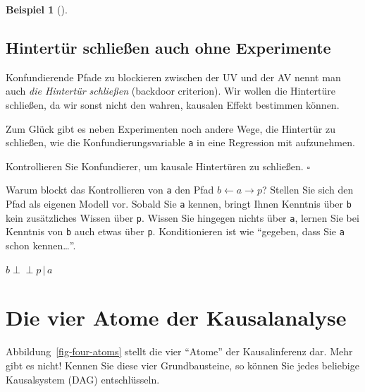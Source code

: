 \documentclass[
  ngerman,
  letterpaper,
  twoside,
  open=any]{scrbook}
\theoremstyle{definition}
\newtheorem{example}{Beispiel}[chapter]
\theoremstyle{plain}
\theoremstyle{definition}
\theoremstyle{definition}
\theoremstyle{remark}
\begin{document}
\begin{example}[]
\begin{tcolorbox}
\end{tcolorbox}

\subsection{Hintertür schließen auch ohne
Experimente}\label{hintertuxfcr-schlieuxdfen-auch-ohne-experimente}

Konfundierende Pfade zu blockieren zwischen der UV und der AV nennt man
auch \emph{die Hintertür schließen} (backdoor criterion). Wir wollen die
Hintertüre schließen, da wir sonst nicht den wahren, kausalen Effekt
bestimmen können.

Zum Glück gibt es neben Experimenten noch andere Wege, die Hintertür zu
schließen, wie die Konfundierungsvariable \texttt{a} in eine Regression
mit aufzunehmen.

\begin{tcolorbox}[enhanced jigsaw, arc=.35mm, bottomrule=.15mm, bottomtitle=1mm, breakable, colback=white, colbacktitle=quarto-callout-tip-color!10!white, colframe=quarto-callout-tip-color-frame, coltitle=black, left=2mm, leftrule=.75mm, opacityback=0, opacitybacktitle=0.6, rightrule=.15mm, title=\textcolor{quarto-callout-tip-color}{\faLightbulb}\hspace{0.5em}{Tipp}, titlerule=0mm, toprule=.15mm, toptitle=1mm]

Kontrollieren Sie Konfundierer, um kausale Hintertüren zu schließen.
\(\square\)

\end{tcolorbox}

Warum blockt das Kontrollieren von \texttt{a} den Pfad
\(b \leftarrow a \rightarrow p\)? Stellen Sie sich den Pfad als eigenen
Modell vor. Sobald Sie \texttt{a} kennen, bringt Ihnen Kenntnis über
\texttt{b} kein zusätzliches Wissen über \texttt{p}. Wissen Sie hingegen
nichts über \texttt{a}, lernen Sie bei Kenntnis von \texttt{b} auch
etwas über \texttt{p}. Konditionieren ist wie \enquote{gegeben, dass Sie
\texttt{a} schon kennen\ldots{}}.

\(b \perp \!\!\! \perp p \,|\,a\)

\section{Die vier Atome der
Kausalanalyse}\label{die-vier-atome-der-kausalanalyse}

Abbildung~\ref{fig-four-atoms} stellt die vier \enquote{Atome} der
Kausalinferenz dar. Mehr gibt es nicht! Kennen Sie diese vier
Grundbausteine, so können Sie jedes beliebige Kausalsystem (DAG)
entschlüsseln.


\end{example}
\end{document}
